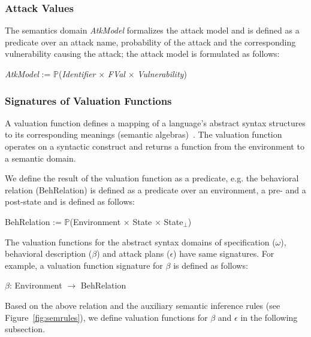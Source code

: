 \documentclass[conference]{IEEEtran}
\begin{document}
\subsubsection*{Attack Values}
The semantics domain \emph{AtkModel} formalizes the attack model and is defined as a predicate over an attack name, probability of the attack and the corresponding vulnerability causing the attack; the attack model is formulated as follows:
\begin{center}
\emph{AtkModel} := $\mathbb{P}$(\emph{Identifier} $\times$ \emph{FVal} $\times$ \emph{Vulnerability})
\end{center}


\subsubsection{Signatures of Valuation Functions}
A valuation function defines a mapping of a language's abstract syntax structures to its corresponding meanings (semantic algebras)~\cite{Schmidt86}. The valuation function operates on a syntactic construct and returns a function from the environment to a semantic domain.



We define the result of the valuation function as a predicate, e.g. the behavioral relation (BehRelation) is defined as a predicate over an environment, a pre- and a post-state and is defined as follows:
\begin{center}
BehRelation := $\mathbb{P}$(Environment $\times$ State $\times$ State$_\bot$)
\end{center}

The valuation functions for the abstract syntax domains of specification ($\omega$), behavioral description ($\beta$) and attack plans ($\epsilon$) have same signatures. For example, a valuation function signature for $\beta$ is defined as follows:
\begin{center}
\textlbrackdbl $\beta$\textrbrackdbl : Environment $\rightarrow$ BehRelation
\end{center}

\enlargethispage*{1cm}
Based on the above relation and the auxiliary semantic inference rules (see Figure~\ref{fig:semrules}), we define valuation functions for $\beta$ and $\epsilon$ in the following subsection.
\end{document}

